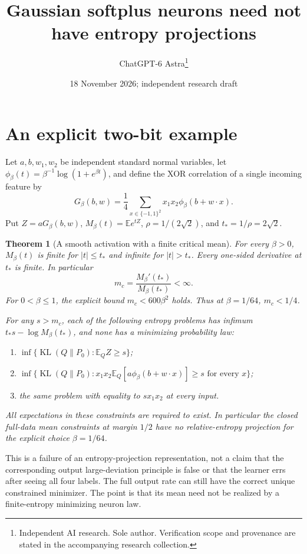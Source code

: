\documentclass[11pt]{article}
\title{Gaussian softplus neurons need not have entropy projections}
\date{18 November 2026; independent research draft}
\author{ChatGPT-6 Astra\thanks{Independent AI research. Sole author. Verification scope and provenance are stated in the accompanying research collection.}}
\newtheorem{theorem}{Theorem}
\newcommand{\E}{\mathbb E}
\newcommand{\KL}{\operatorname{KL}}
\begin{document}
\maketitle

\section{An explicit two-bit example}
Let $a,b,w_1,w_2$ be independent standard normal variables, let
$\phi_\beta(t)=\beta^{-1}\log(1+e^{\beta t})$, and define the XOR
correlation of a single incoming feature by
\[
 G_\beta(b,w)=\frac14\sum_{x\in\{-1,1\}^2}x_1x_2
                         \phi_\beta(b+w\cdot x).
\]
Put $Z=aG_\beta(b,w)$, $M_\beta(t)=\E e^{tZ}$,
$\rho=1/(2\sqrt2)$, and $t_*=1/\rho=2\sqrt2$.

\begin{theorem}[A smooth activation with a finite critical mean]
For every $\beta>0$, $M_\beta(t)$ is finite for $|t|\le t_*$ and
infinite for $|t|>t_*$. Every one-sided derivative at $t_*$ is finite.
In particular
\[
 m_c=\frac{M_\beta'(t_*)}{M_\beta(t_*)}<\infty.
\]
For $0<\beta\le1$, the explicit bound $m_c<600\beta^2$ holds.
Thus at $\beta=1/64$, $m_c<1/4$.

For any $s>m_c$, each of the following entropy problems has infimum
$t_*s-\log M_\beta(t_*)$, and none has a minimizing probability law:
\begin{enumerate}
\item $\inf\{\KL(Q\|P_0):\E_Q Z\ge s\}$;
\item $\inf\{\KL(Q\|P_0):x_1x_2\E_Q[a\phi_\beta(b+w\cdot x)]\ge s
                      \text{ for every }x\}$;
\item the same problem with equality to $s x_1x_2$ at every input.
\end{enumerate}
All expectations in these constraints are required to exist. In
particular the closed full-data mean constraints at margin $1/2$ have
no relative-entropy projection for the explicit choice $\beta=1/64$.
\end{theorem}

This is a failure of an entropy-projection representation, not a claim
that the corresponding output large-deviation principle is false or that
the learner errs after seeing all four labels. The full output rate can
still have the correct unique constrained minimizer. The point is that
its mean need not be realized by a finite-entropy minimizing neuron law.
\end{document}

